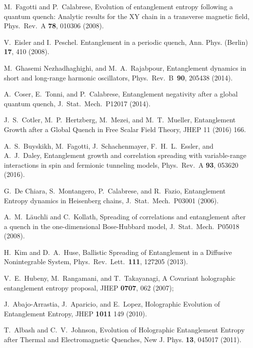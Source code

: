 \documentclass[twocolumn,superscriptaddress,prb,10pt]{revtex4-1}
\begin{document}
\begin{thebibliography}{99}
M.~Fagotti and P.~Calabrese, Evolution of entanglement entropy
following  a  quantum  quench: Analytic  results  for  the  XY
chain in a transverse magnetic field, Phys.\ Rev.\ A {\bf 78}, 
010306 (2008).

	V.~Eisler and I.~Peschel. Entanglement in a periodic quench, 
	Ann. Phys. (Berlin) {\bf 17}, 410 (2008).

	M.~Ghasemi Nezhadhaghighi, and M.~A.~Rajabpour, 
	Entanglement dynamics in short and long-range harmonic oscillators, 
	Phys.\ Rev.\ B\ {\bf 90}, 205438 (2014). 

	A.~Coser, E.~Tonni, and P.~Calabrese,  
	Entanglement negativity after a global quantum quench, 
	J.\ Stat.\ Mech.\ P12017 (2014). 

	J.~S.~Cotler, M.~P.~Hertzberg, M.~Mezei, and M.~T.~Mueller, 
	Entanglement Growth after a Global Quench
	in Free Scalar Field Theory, JHEP 11 (2016) 166.

	A.~S.~Buyskikh, M.~Fagotti, J.~Schachenmayer, F.~H.~L.~Essler, and A.~J.~Daley, 
	Entanglement growth and correlation spreading with variable-range interactions
	in spin and fermionic tunneling models, 
	Phys.\ Rev.\ A {\bf 93}, 053620 (2016).

	G.~De Chiara, S.~Montangero, P.~Calabrese, and R.~Fazio, 
	Entanglement Entropy dynamics in Heisenberg chains, 
	J.\ Stat.\ Mech.\ P03001 (2006).

	A.~M.~L\"auchli and C.~Kollath, 
	Spreading of correlations and entanglement after a quench in the one-dimensional Bose-Hubbard model, 
	J.\ Stat.\ Mech.\ P05018 (2008).


	H.~Kim  and D.~A.~Huse, Ballistic Spreading of Entanglement in a Diffusive Nonintegrable System, 
	Phys.\ Rev.\ Lett.\ {\bf 111}, 127205 (2013).


	V.~E.~Hubeny, M.~Rangamani, and T.~Takayanagi, A Covariant holographic entanglement entropy proposal, 
	JHEP {\bf 0707},  062 (2007);

	J.~Abajo-Arrastia, J.~Aparicio, and E.~Lopez, 
	Holographic Evolution of Entanglement Entropy, 
	JHEP {\bf 1011} 149 (2010).


	T.~Albash and C.~V.~Johnson, Evolution of Holographic Entanglement Entropy after Thermal and Electromagnetic Quenches, 
	New J. Phys. {\bf 13}, 045017 (2011).


\end{thebibliography}
\end{document}

